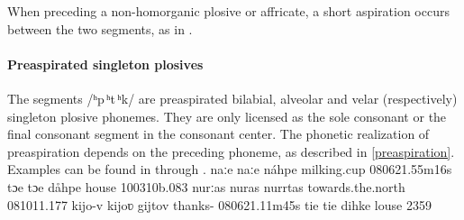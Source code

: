 When preceding a non-homorganic plosive or affricate, a short aspiration occurs between the two segments, as in . 



\paragraph{Preaspirated singleton plosives}
The segments \mbox{/ʰp\,ʰt\,ʰk/} are preaspirated bilabial, alveolar and velar (respectively) singleton plosive phonemes. They are only licensed as the sole consonant or the final consonant segment in the consonant center. 
The phonetic realization of preaspiration depends on the preceding phoneme, as described in \SEC\ref{preaspiration}. 
Examples can be found in  through . 
	{naːe}		{naːe}	{náhpe}	{milking.cup\BS{}}	{080621}{.55m16s}
		{tɔe}		{tɔe}		{dåhpe}	{house\BS{}}		{100310b}{.083}
		{nurːas}	{nuras}	{nurrtas}	{towards.the.north}		{081011}{.177}
		{kijo-v}		{kijoʋ}		{gijtov}	{thanks-}		{080621}{.11m45s}
		{tie}		{tie}		{dihke}	{louse\BS{}}		{2359}

